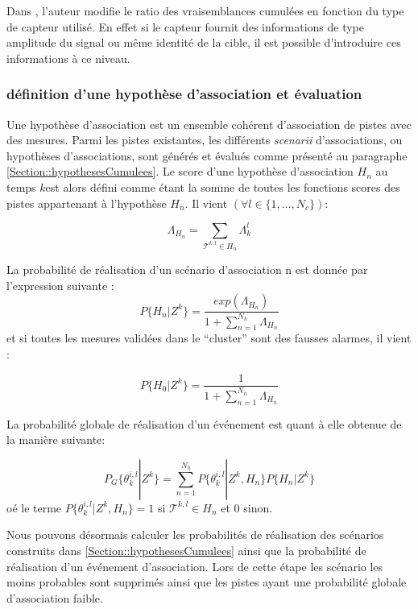 \documentclass[10pt,french,a4paper]{report}
\begin{document}
			 Dans \cite{Blackman1999}, l'auteur modifie le ratio des vraisemblances cumulées  en fonction du type de capteur utilisé. En effet si le capteur fournit des informations de type amplitude du signal ou même identité de la cible, il est possible d'introduire ces informations à ce niveau.  
			 
			 \subsubsection{définition d'une hypothèse d'association et évaluation}
			 
			 Une hypothèse d'association est un ensemble cohérent d'association de pistes avec des mesures. Parmi les pistes existantes, les différents \textit{scenarii} d'associations, ou hypothèses d'associations, sont générés et évalués comme présenté au paragraphe \ref{Section::hypothesesCumulees}. Le score   d'une hypothèse d'association $H_n$ au temps $k $est alors défini comme étant la somme de toutes les fonctions scores   des pistes appartenant à l'hypothèse $H_n$. Il vient $(\forall l \in \{1,\ldots,N_c\})$: 
			 
\begin{equation}  
 	   \Lambda_{H_n}=\sum_{\mathcal{T}^{k,l}\in H_n}  \Lambda_k^{l} 
\end{equation}

La probabilité de réalisation d'un scénario d'association n est donnée par l'expression suivante :
\begin{equation}  
 	   P\{H_n|Z^k\}= \frac{exp(\Lambda_{H_n})}{1+\sum_{n = 1}^{N_h}  \Lambda_{H_n}} 
\end{equation}
et si toutes les mesures validées dans le ``cluster'' sont des fausses alarmes, il vient :

\begin{equation}  
 	   P\{H_0|Z^k\}= \frac{1}{1+\sum_{n = 1}^{N_h}  \Lambda_{H_n}} 
\end{equation}

La probabilité globale de réalisation d'un événement est quant à elle obtenue de la manière suivante:

\begin{equation}  
 	   P_G\{\theta_k^{i,l}|Z^k\}=  \sum_{n=1}^{N_h} P\{\theta_k^{i,l}|Z^k,H_n\}P\{H_n|Z^k\}
\end{equation}
oé le terme $P\{\theta_k^{i,l}|Z^k,H_n\} = 1 $ si  $\mathcal{T}^{k,l} \in H_n$ et 0 sinon.

Nous pouvons désormais calculer les probabilités de réalisation des scénarios construits dans  \ref{Section::hypothesesCumulees} ainsi que la probabilité de réalisation d'un événement d'association. Lors de cette étape les scénario les moins probables sont supprimés ainsi que les pistes ayant une probabilité globale d'association faible. 
 
\end{document}
